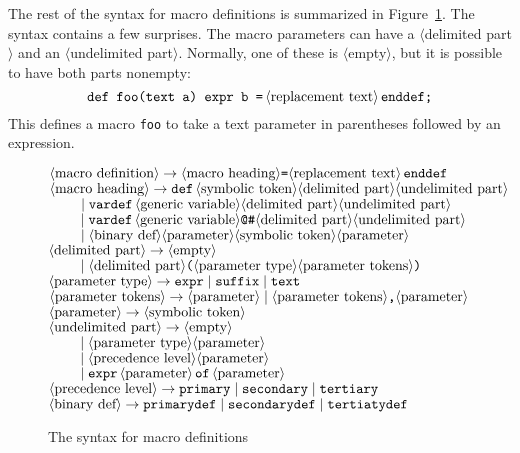 \documentclass{article} %
\newcommand\descr[1]{{\langle\hbox{#1}\rangle}}
\newcommand\invisgap{\nobreak\hskip0pt\relax}
\newcommand\tdescr[1]{$\langle$\invisgap#1\invisgap$\rangle$}
\begin{document}
The rest of the syntax for macro definitions is summarized in
Figure~\ref{symacro}.  The syntax contains a few surprises.  The macro
parameters can have a \tdescr{delimited part} and an \tdescr{undelimited
part}.  Normally, one of these is \tdescr{empty}, but it is possible to
have both parts nonempty:
$$ \hbox{\tt def foo(text a) expr b =}\, \descr{replacement text}\,
   \hbox{\tt enddef;}
$$
This defines a macro {\tt foo} to take a text parameter in parentheses followed
by an expression.

\begin{figure}[htp]
\begin{ctabbing}
$\tt \descr{macro definition} \rightarrow
        \descr{macro heading} \hbox{\tt =} \descr{replacement text}\, enddef$\\
$\tt \descr{macro heading} \rightarrow  def\, \descr{symbolic token}
        \descr{delimited part} \descr{undelimited part}$\\
$\tt \qquad \;|\; vardef\, \descr{generic variable} \descr{delimited part}
        \descr{undelimited part}$\\
$\tt \qquad \;|\; vardef\, \descr{generic variable} \hbox{\tt @\#}
        \descr{delimited part} \descr{undelimited part}$\\
$\tt \qquad \;|\; \descr{binary def} \descr{parameter}
        \descr{symbolic token} \descr{parameter}$\\
$\tt \descr{delimited part} \rightarrow \descr{empty}$\\
$\tt \qquad \;|\; \descr{delimited part}
        \hbox{\tt (}\descr{parameter type} \descr{parameter tokens}\hbox{\tt )}$\\
$\tt \descr{parameter type} \rightarrow expr \;|\; suffix \;|\; text$\\
$\tt \descr{parameter tokens} \rightarrow \descr{parameter} \;|\;
        \descr{parameter tokens}\hbox{\tt ,} \descr{parameter}$\\
$\tt \descr{parameter} \rightarrow \descr{symbolic token}$\\
$\tt \descr{undelimited part} \rightarrow \descr{empty}$\\
$\tt \qquad \;|\; \descr{parameter type} \descr{parameter}$\\
$\tt \qquad \;|\; \descr{precedence level} \descr{parameter}$\\
$\tt \qquad \;|\; expr\, \descr{parameter}\, of\, \descr{parameter}$\\
$\tt \descr{precedence level} \rightarrow primary \;|\; secondary \;|\;
        tertiary$\\
$\tt \descr{binary def} \rightarrow primarydef \;|\; secondarydef \;|\;
        tertiatydef$
\end{ctabbing}
\caption{The syntax for macro definitions}
\label{symacro}
\end{figure}
\end{document}
